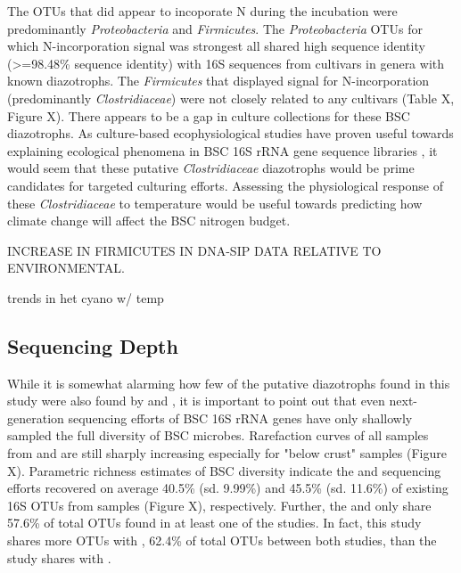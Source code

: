 The OTUs that did appear to incoporate N during the incubation were predominantly \textit{Proteobacteria} and \textit{Firmicutes}. The \textit{Proteobacteria} OTUs for which N-incorporation signal was strongest all shared high sequence identity (\textgreater=98.48\% sequence identity) with 16S sequences from cultivars in genera with known diazotrophs. The \textit{Firmicutes} that displayed signal for N-incorporation (predominantly \textit{Clostridiaceae}) were not closely related to any cultivars (Table X, Figure X). There appears to be a gap in culture collections for these BSC diazotrophs. As culture-based ecophysiological studies have proven useful towards explaining ecological phenomena in BSC 16S rRNA gene sequence libraries \cite{Garcia_Pichel_2013}, it would seem that these putative \textit{Clostridiaceae} diazotrophs would be prime candidates for targeted culturing efforts. Assessing the physiological response of these \textit{Clostridiaceae} to temperature would be useful towards predicting how climate change will affect the BSC nitrogen budget. 

INCREASE IN FIRMICUTES IN DNA-SIP DATA RELATIVE TO ENVIRONMENTAL.

\cite{Yeager_2012} trends in het cyano w/ temp

\subsection{Sequencing Depth}
While it is somewhat alarming how few of the putative diazotrophs found in this study were also found by \citet{Garcia_Pichel_2013} and \citet{Steven_2013}, it is important to point out that even next-generation sequencing efforts of BSC 16S rRNA genes have only shallowly sampled the full diversity of BSC microbes. Rarefaction curves of all samples from \citet{Steven_2013} and \citet{Garcia_Pichel_2013} are still sharply increasing especially for "below crust" samples (Figure X). Parametric richness estimates of BSC diversity indicate the \citet{Steven_2013} and \citet{Garcia_Pichel_2013} sequencing efforts recovered on average 40.5\% (sd. 9.99\%) and 45.5\% (sd. 11.6\%) of existing 16S OTUs from samples (Figure X), respectively. Further, the \citet{Steven_2013} and \citet{Garcia_Pichel_2013} only share 57.6\% of total OTUs found in at least one of the studies. In fact, this study shares more OTUs with \citet{Steven_2013}, 62.4\% of total OTUs between both studies, than the \citet{Steven_2013} study shares with \citet{Garcia_Pichel_2013}. 

